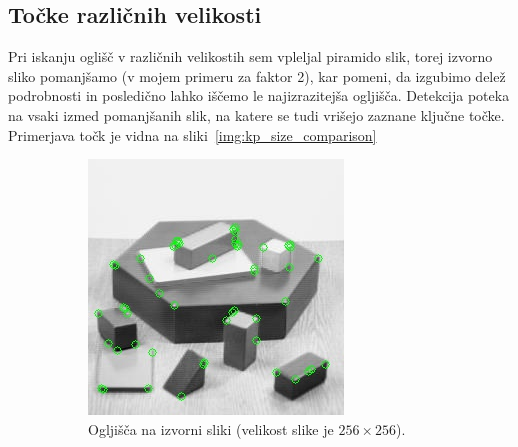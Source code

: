\documentclass[a4paper,11pt]{article}
\begin{document}
\subsection{Točke različnih velikosti}

Pri iskanju oglišč v različnih velikostih sem vpleljal piramido slik, torej izvorno sliko pomanjšamo (v mojem primeru za faktor 2), kar pomeni, da izgubimo delež podrobnosti in posledično lahko iščemo le najizrazitejša ogljišča. Detekcija poteka na vsaki izmed pomanjšanih slik, na katere se tudi vrišejo zaznane ključne točke. Primerjava točk je vidna na sliki~\ref{img:kp_size_comparison}

\begin{figure}[h!b]
	\centering
	\begin{subfigure}[t]{0.48\textwidth}
		\centering
		\includegraphics[width=\textwidth]{images/blox_corners_L0.jpg}
		\caption{Ogljišča na izvorni sliki (velikost slike je $256\times256$).}
		\label{img:kp_L0}
	\end{subfigure}
	\hfill
	\begin{subfigure}[t]{0.48\textwidth}
		\centering

\end{subfigure}
\end{figure}
\end{document}
